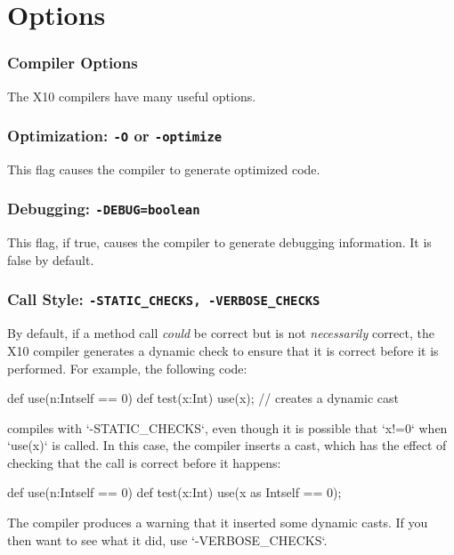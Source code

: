 \chapter{Options}

\subsection{Compiler Options}

The X10 compilers have many useful options. 


\subsection{Optimization: {\tt -O} or {\tt -optimize}}

This flag causes the compiler to generate optimized code.


\subsection{Debugging: {\tt -DEBUG=boolean}}

This flag, if true, causes the compiler to generate debugging information.  It
is false by default.

\subsection{Call Style: {\tt -STATIC\_CHECKS, -VERBOSE\_CHECKS}}
\label{sect:Callstyle}

By default, if a method call {\em could} be correct but is not {\em
necessarily} correct, the X10 compiler generates a dynamic check to ensure
that it is correct before it is performed.  For example, the following code: 
\begin{xten}
def use(n:Int{self == 0}) {}
def test(x:Int) { 
   use(x); // creates a dynamic cast
}
\end{xten}
compiles with \xcd`-STATIC_CHECKS`, even though it is possible that 
\xcd`x!=0` when \xcd`use(x)` is called.  In this case, the compiler inserts a
cast, which has the effect of checking that the call is correct before it
happens: 
\begin{xten}
def use(n:Int{self == 0}) {}
def test(x:Int) { 
   use(x as Int{self == 0}); 
}
\end{xten}
The compiler produces a warning that it inserted some dynamic casts.
If you then want to see what it did, use \xcd`-VERBOSE_CHECKS`.

